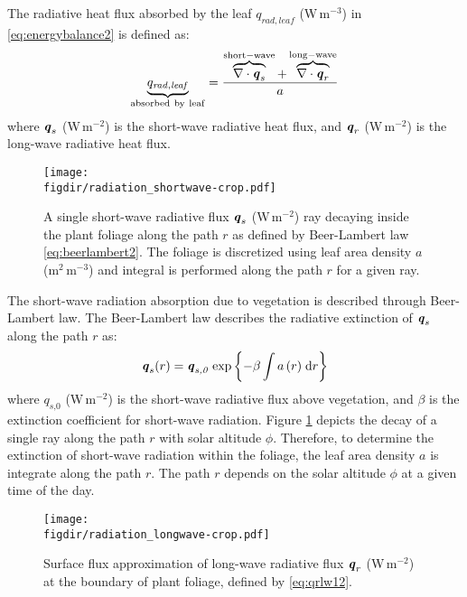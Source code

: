 The radiative heat flux absorbed by the leaf ${q_{\mathit{rad,leaf}}}$ (W\,m$^{-3}$) in \cref{eq:energybalance2} is defined as:
\begin{equation}
\underbrace{q_{\mathit{rad,leaf}}}_{\mathrm{absorbed\ by\ leaf}} = \frac {\overbrace{\nabla  \cdot \mvec{q}_s}^{\mathrm{short-wave}} + \overbrace{\nabla  \cdot \mvec{q}_r}^{\mathrm{long-wave}}}{a}
\label{eq:qradleaf2}
\end{equation}
where $\textbf{\textit{q}}_s$ (W\,m$^{-2}$) is the short-wave radiative heat flux, and $\textbf{\textit{q}}_r$ (W\,m$^{-2}$) is the long-wave radiative heat flux. 

\begin{figure}[t]
	\centering
	\texttt{[image: \\figdir/radiation\_shortwave-crop.pdf]}
	\caption{A single short-wave radiative flux $\textbf{\textit{q}}_s$ (W\,m$^{-2}$) ray decaying inside the plant foliage along the path $r$ as defined by Beer-Lambert law  \cref{eq:beerlambert2}. The foliage is discretized using leaf area density $a$ (m$^2$\,m$^{-3}$) and integral is performed along the path $r$ for a given ray.}
	\label{fig:radiation_shortwave}
\end{figure}


The short-wave radiation absorption due to vegetation is described through Beer-Lambert law. The Beer-Lambert law describes the radiative extinction of $\textbf{\textit{q}}_s$ along the path $r$ as:
\begin{equation}
\textbf{\textit{q}}_s(r) = \textbf{\textit{q}}_{\textit{s,0}}\,\exp\left\{ - \beta \int{a\left( r \right)} \;\mathrm{d}r \right\}
\label{eq:beerlambert2}
\end{equation}
where $q_{\textit{s,0}}$ (W\,m$^{-2}$) is the short-wave radiative flux above vegetation, and $\beta$ is the extinction coefficient for short-wave radiation. Figure \cref{fig:radiation_shortwave} depicts the decay of a single ray along the path $r$ with solar altitude $\phi$. Therefore, to determine the extinction of short-wave radiation within the foliage, the leaf area density $a$ is integrate along the path $r$. The path $r$ depends on the solar altitude $\phi$ at a given time of the day.

	\begin{figure}[t]
		\centering
		\texttt{[image: \\figdir/radiation\_longwave-crop.pdf]}
		\caption{Surface flux approximation of long-wave radiative flux $\textbf{\textit{q}}_r$ (W\,m$^{-2}$) at the boundary of plant foliage, defined by \cref{eq:qrlw12}.}
		\label{fig:radiation_longwave}
	\end{figure}


